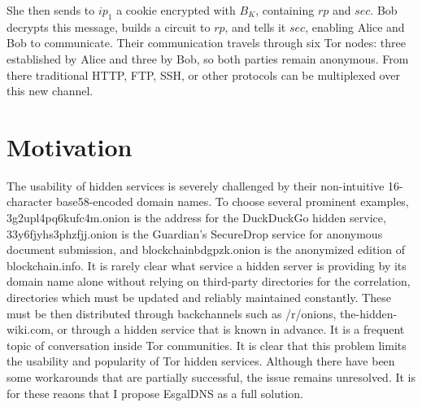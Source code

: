 She then sends to $ ip_{1} $ a cookie encrypted with $ B_{K} $, containing $ rp $ and $ sec $. Bob decrypts this message, builds a circuit to $ rp $, and tells it $ sec $, enabling Alice and Bob to communicate. Their communication travels through six Tor nodes: three established by Alice and three by Bob, so both parties remain anonymous. From there traditional HTTP, FTP, SSH, or other protocols can be multiplexed over this new channel.

\section{Motivation}

The usability of hidden services is severely challenged by their non-intuitive 16-character base58-encoded domain names. To choose several prominent examples, 3g2upl4pq6kufc4m.onion is the address for the DuckDuckGo hidden service, 33y6fjyhs3phzfjj.onion is the Guardian's SecureDrop service for anonymous document submission, and blockchainbdgpzk.onion is the anonymized edition of blockchain.info. It is rarely clear what service a hidden server is providing by its domain name alone without relying on third-party directories for the correlation, directories which must be updated and reliably maintained constantly. These must be then distributed through backchannels such as /r/onions, the-hidden-wiki.com, or through a hidden service that is known in advance. It is a frequent topic of conversation inside Tor communities. It is clear that this problem limits the usability and popularity of Tor hidden services. Although there have been some workarounds that are partially successful, the issue remains unresolved. It is for these reaons that I propose EsgalDNS as a full solution.
